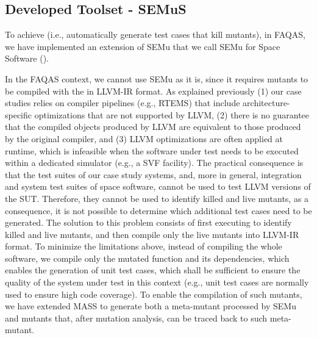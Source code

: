 
\newpage
\subsection{Developed Toolset - SEMuS}
\label{sec:semus}

\STARTCHANGEDWPT


To achieve  (i.e., automatically generate test cases that kill mutants), in FAQAS, we have implemented an extension of SEMu that we call SEMu for Space Software ().



In the FAQAS context, we cannot use SEMu as it is, since it requires mutants to be compiled with the  in LLVM-IR format. As explained previously (1) our case studies relies on compiler pipelines (e.g., RTEMS) that include architecture-specific optimizations that are not supported by LLVM, (2) there is no guarantee that the compiled objects produced by LLVM are equivalent to those produced by the original compiler, and (3) LLVM optimizations are often applied at runtime, which is infeasible when the software under test needs to be executed within a dedicated simulator (e.g., a SVF facility). The practical consequence is that the test suites of our case study systems, and, more in general, integration and system test suites of space software, cannot be used to test LLVM versions of the SUT. 
Therefore, they cannot be used to identify killed and live mutants, as a consequence, it is not possible to determine which additional test cases need to be generated. 
The solution to this problem consists of first executing  to identify killed and live mutants, and then compile only the live mutants into LLVM-IR format. 
To minimize the limitations above, instead of compiling the whole software, we compile only the mutated function and its dependencies, which enables the generation of unit test cases, which shall be sufficient to ensure the quality of the system under test in this context (e.g., unit test cases are normally used to ensure high code coverage). To enable the compilation of such mutants, we have extended MASS to generate both a meta-mutant processed by SEMu and mutants that, after mutation analysis, can be traced back to such meta-mutant.

